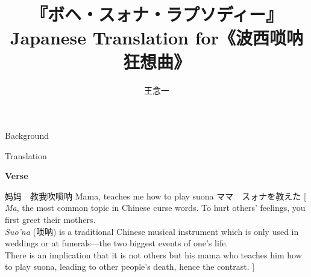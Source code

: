 \documentclass{ctexart}
\newenvironment{lverse}
	{
		\par
		\textbf{\LARGE Verse}
		\vspace{.5em}
		\par
	}
	{
		\par
	}
\begin{document}
\setlength{\droptitle}{-.5in}
\setlength{\parindent}{0pt}
\setlength{\parskip}{4pt}

\title{
	『ボヘ・スォナ・ラプソディー』 \\
	{\large Japanese Translation for《波西唢呐狂想曲》}
}
\author{王念一}
\maketitle

\begin{section}{Background}
\end{section}

\begin{section}{Translation}
	\begin{lverse}
		\lline
			{妈妈　教我吹唢呐}
			{Mama, teaches me how to play suona}
			{ママ　スォナを教えた}
			[
				\textit{Ma}, the most common topic in Chinese curse words.
				To hurt others' feelings, you first greet their mothers. \\
				\textit{Suo'na} (唢呐) is a traditional Chinese musical instrument which is only used in weddings or at funerals---the two biggest events of one's life. \\
				There is an implication that it is not others but his mama who teaches him how to play suona, leading to other people's death, hence the contrast.
			]


\end{lverse}
\end{section}
\end{document}
